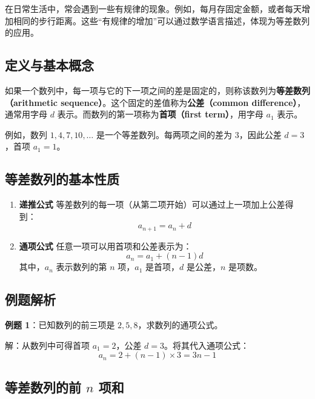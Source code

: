 
\begin{issues}
\issueDraft
\end{issues}




在日常生活中，常会遇到一些有规律的现象。例如，每月存固定金额，或者每天增加相同的步行距离。这些“有规律的增加”可以通过数学语言描述，体现为等差数列的应用。

\subsection*{定义与基本概念}

如果一个数列中，每一项与它的下一项之间的差是固定的，则称该数列为\textbf{等差数列（arithmetic sequence）}。这个固定的差值称为\textbf{公差（common difference）}，通常用字母 $d$ 表示。而数列的第一项称为\textbf{首项（first term）}，用字母 $a_1$ 表示。

例如，数列 $1, 4, 7, 10, \dots$ 是一个等差数列。每两项之间的差为 $3$，因此公差 $d=3$，首项 $a_1=1$。

\subsection*{等差数列的基本性质}

\begin{enumerate}
    \item \textbf{递推公式}  
    等差数列的每一项（从第二项开始）可以通过上一项加上公差得到：
    \[
    a_{n+1} = a_n + d
    \]

    \item \textbf{通项公式}  
    任意一项可以用首项和公差表示为：
    \[
    a_n = a_1 + (n-1)d
    \]
    其中，$a_n$ 表示数列的第 $n$ 项，$a_1$ 是首项，$d$ 是公差，$n$ 是项数。
\end{enumerate}

\subsection*{例题解析}

\textbf{例题 1}：已知数列的前三项是 $2, 5, 8$，求数列的通项公式。

解：从数列中可得首项 $a_1 = 2$，公差 $d = 3$。将其代入通项公式：
\[
a_n = 2 + (n-1) \times 3 = 3n - 1
\]

\subsection*{等差数列的前 $n$ 项和}


